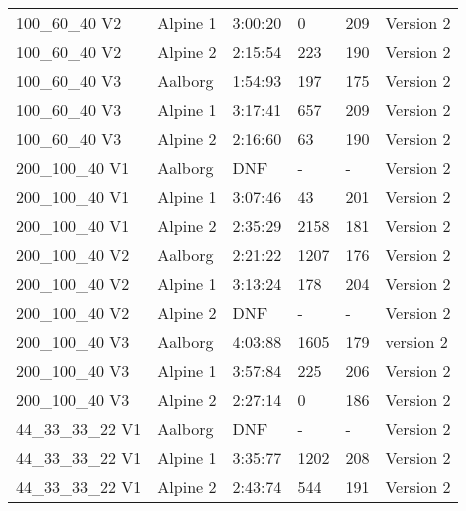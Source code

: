 \begin{table}[H]
\begin{tabular}{llllll}
 100\_60\_40 V2 & Alpine 1 & 3:00:20 & 0 & 209 & Version 2	\\
 100\_60\_40 V2 & Alpine 2 & 2:15:54 & 223 & 190 & Version 2 \\ \hline
 100\_60\_40 V3 & Aalborg & 1:54:93  & 197 & 175 & Version 2   \\ 
 100\_60\_40 V3 & Alpine 1 & 3:17:41  & 657 & 209 & Version 2   \\ 
 100\_60\_40 V3 & Alpine 2 & 2:16:60  & 63 & 190 & Version 2   \\ \hline 
 200\_100\_40 V1 & Aalborg & DNF & - & - & Version 2 \\
 200\_100\_40 V1 & Alpine 1 & 3:07:46 & 43 & 201 & Version 2 \\
 200\_100\_40 V1 & Alpine 2 & 2:35:29 & 2158 & 181 & Version 2 \\ \hline
 200\_100\_40 V2 & Aalborg & 2:21:22 & 1207 & 176 & Version 2 \\
 200\_100\_40 V2 & Alpine 1 & 3:13:24 & 178 & 204 & Version 2 \\
 200\_100\_40 V2 & Alpine 2 & DNF & - & - & Version 2 \\  \hline
 200\_100\_40 V3 & Aalborg & 4:03:88 & 1605 & 179 & version 2 \\
 200\_100\_40 V3 & Alpine 1 & 3:57:84 & 225 & 206 & Version 2 \\
 200\_100\_40 V3 & Alpine 2 & 2:27:14 & 0 & 186 & Version 2 \\ \hline
 44\_33\_33\_22 V1 & Aalborg & DNF & - & - & Version 2 \\
 44\_33\_33\_22 V1 & Alpine 1 & 3:35:77 & 1202 & 208 & Version 2 \\
 44\_33\_33\_22 V1 & Alpine 2 & 2:43:74 & 544 & 191 & Version 2 \\ \hline
 
\end{tabular}
\end{table}
